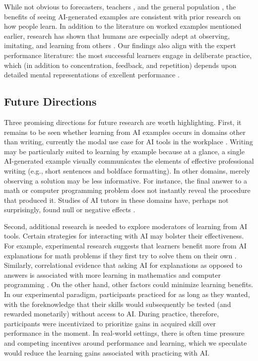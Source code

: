 \documentclass[11pt]{report}
\begin{document}
\begin{mainf}
While not obvious to forecasters, teachers \cite{lin2024a}, and the general population \cite{hawkins2024between}, the benefits of seeing AI-generated examples are consistent with prior research on how people learn. 
 In addition to the literature on worked examples mentioned earlier, research has shown that humans are especially adept at observing, imitating, and learning from others \cite{bandura1971, meltzoff2005imitation, lyons2007hidden}. 
  Our findings also align with the expert performance literature: the most successful learners engage in deliberate practice, which (in addition to concentration, feedback, and repetition) depends upon detailed mental representations of excellent performance \cite{anders2008deliberate}.   

\subsection{Future Directions}
Three promising directions for future research are worth highlighting.
First, it remains to be seen whether learning from AI examples occurs in domains other than writing, currently the modal use case for AI tools in the workplace \cite{bick2024rapid}. Writing may be particularly suited to learning by example because at a glance, a single AI-generated example visually communicates the elements of effective professional writing (e.g., short sentences and boldface formatting). 
    In other domains, merely observing a solution may be less informative. For instance, the final answer to a math or computer programming problem does not instantly reveal the procedure that produced it. Studies of AI tutors in these domains have, perhaps not surprisingly, found null or negative effects \cite{bastani2024, nie2024gpt}.    

   

    
Second, additional research is needed to explore moderators of learning from AI tools. 
    Certain strategies for interacting with AI may bolster their effectiveness.
    For example, experimental research suggests that learners benefit more from AI explanations for math problems if they first try to solve them on their own \cite{kumar2023}. 
    Similarly, correlational evidence that asking AI for explanations as opposed to answers is associated with more learning in mathematics \cite{bastani2024} and computer programming \cite{lehmann2024ai}.
    On the other hand, other factors could minimize learning benefits.
    In our experimental paradigm, participants practiced for as long as they wanted, with the foreknowledge that their skills would subsequently be tested (and rewarded monetarily) without access to AI. 
    During practice, therefore, participants were incentivized to prioritize gains in acquired skill over performance in the moment. 
    In real-world settings, there is often time pressure and competing incentives around performance and learning, which we speculate would reduce the learning gains associated with practicing with AI.


\end{mainf}
\end{document}
